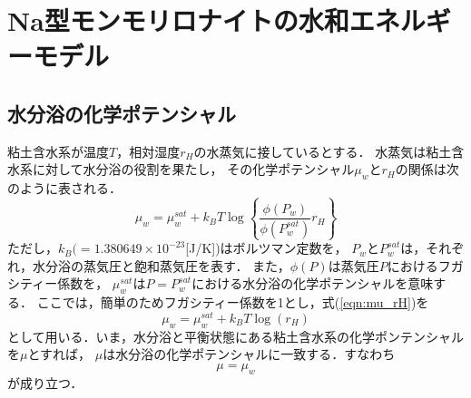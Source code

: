 ﻿\section{Na型モンモリロナイトの水和エネルギーモデル}
\subsection{水分浴の化学ポテンシャル}
粘土含水系が温度$T$，相対湿度$r_H$の水蒸気に接しているとする．
水蒸気は粘土含水系に対して水分浴の役割を果たし，
その化学ポテンシャル$\mu_w$と$r_H$の関係は次のように表される\cite{Tombach}．
\begin{equation}
	\mu_w
	=
	\mu_w^{sat} +k_BT \log
	\left\{
		\frac{\phi(P_w)}{\phi(P^{sat}_w)}
		r_H
	\right\}
	\label{eqn:mu_rH}
\end{equation}
ただし，$k_B(=1.380649\times 10^{-23}$[J/K])はボルツマン定数を，
$P_w$と$P^{sat}_w$は，それぞれ，水分浴の蒸気圧と飽和蒸気圧を表す．
また，$\phi(P)$は蒸気圧$P$におけるフガシティー係数を，
$\mu_w^{sat}$は$P=P^{sat}_w$における水分浴の化学ポテンシャルを意味する．
ここでは，簡単のためフガシティー係数を1とし，式(\ref{eqn:mu_rH})を
\begin{equation}
	\mu_w
	=
	\mu_w^{sat} +k_BT \log
	\left(
		r_H
	\right)
	\label{eqn:mu_rH_simple}
\end{equation}
として用いる．いま，水分浴と平衡状態にある粘土含水系の化学ポンテンシャルを$\mu$とすれば， 
$\mu$は水分浴の化学ポテンシャルに一致する．すなわち
\begin{equation}
	\mu=\mu_{w}
	\label{eqn:equiv_mu}
\end{equation}
が成り立つ．
